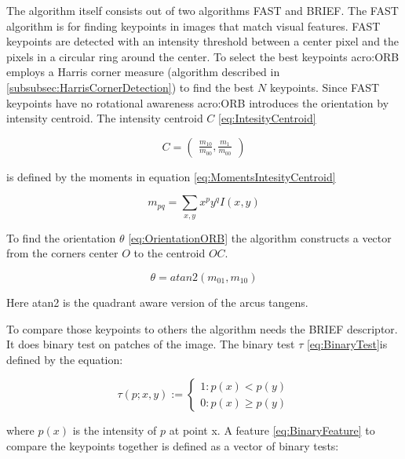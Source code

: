 The algorithm itself consists out of two algorithms FAST and BRIEF. The FAST algorithm is for finding keypoints in images that match visual features. FAST keypoints are detected with an intensity threshold between a center pixel and the pixels in a circular ring around the center. To select the best keypoints \acrshort{acro:ORB} employs a Harris corner measure (algorithm described in \ref{subsubsec:HarrisCornerDetection}) to find the best $N$ keypoints. Since FAST keypoints have no rotational awareness \acrshort{acro:ORB} introduces the orientation by intensity centroid. The intensity centroid $C$ \eqref{eq:IntesityCentroid}

\begin{equation}\label{eq:IntesityCentroid} C = \begin{pmatrix}
\frac{m_{10}}{m_{00}},\frac{m_{1}}{m_{00}}\end{pmatrix} \end{equation}

is defined by the moments in equation \eqref{eq:MomentsIntesityCentroid}

\begin{equation}\label{eq:MomentsIntesityCentroid} m_{pq} = \sum_{x,y} x^p y^q I(x,y)\end{equation}

To find the orientation $\theta$ \eqref{eq:OrientationORB} the algorithm constructs a vector from the corners center $O$ to the centroid $OC$.

\begin{equation}\label{eq:OrientationORB} \theta = atan2(m_{01},m_10)\end{equation}

Here atan2 is the quadrant aware version of the arcus tangens.

To compare those keypoints to others the algorithm needs the BRIEF descriptor. It does binary test on patches of the image. The binary test $\tau$ \eqref{eq:BinaryTest}is defined by the equation:

\begin{equation}\label{eq:BinaryTest} \tau(p;x,y) := \begin{cases} 1 :p(x) < p(y) \\ 0 :p(x) \geq p(y)\end{cases}\end{equation}

where $p(x)$ is the intensity of $p$ at point x. A feature \eqref{eq:BinaryFeature} to compare the keypoints together is defined as a vector of binary tests: 


